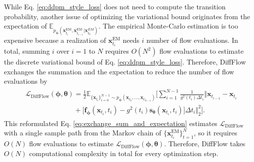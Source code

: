 \documentclass{article}
\theoremstyle{definition}
\theoremstyle{remark}
\begin{document}
	While Eq. \eqref{eq:ddpm_style_loss} does not need to compute the transition probability, another issue of optimizing the variational bound originates from the expectation of $\mathbb{E}_{p_{\bm{\phi}}(\mathbf{x}_{t_{i}}^{\text{EM}},\mathbf{x}_{t_{i-1}}^{\text{EM}}\vert\mathbf{x}_{t_{0}}^{EM})}$. The empirical Monte-Carlo estimation is too expensive because a realization of $\mathbf{x}_{t_{i}}^{\text{EM}}$ needs $i$ number of flow evaluations. In total, summing $i$ over $i=1$ to $N$ requires $O(N^{2})$ flow evaluations to estimate the discrete variational bound of Eq. \eqref{eq:ddpm_style_loss}. Therefore, DiffFlow exchanges the summation and the expectation to reduce the number of flow evaluations by
	\begin{align}
	\begin{split}\label{eq:exchange_sum_and_expectation}
	&\mathcal{L}_{\text{DiffFlow}}(\bm{\phi},\bm{\theta})=\frac{1}{2}\mathbb{E}_{\{\mathbf{x}_{t_{i}}\}_{i=0}^{N-1}\sim p_{\bm{\phi}}(\mathbf{x}_{t_{0}},...,\mathbf{x}_{t_{N-1}})}\bigg[\sum_{i=1}^{N-1}\frac{1}{g^{2}(t_{i})\Delta t_{i}}\Big\Vert\mathbf{x}_{t_{i-1}}-\mathbf{x}_{t_{i}}\\
	&\quad\quad\quad\quad\quad\quad\quad+\big[\mathbf{f}_{\bm{\phi}}(\mathbf{x}_{t_{i}},t_{i})-g^{2}(t_{i})\mathbf{s}_{\bm{\theta}}(\mathbf{x}_{t_{i}},t_{i})\big]\Delta t_{i}\Big\Vert_{2}^{2}\bigg].
	\end{split}
	\end{align}
	This reformulated Eq. \eqref{eq:exchange_sum_and_expectation} estimates $\mathcal{L}_{\text{DiffFlow}}$ with a single sample path from the Markov chain of $\{\mathbf{x}_{t_{i}}^{\text{EM}}\}_{t=1}^{N}$, so it requires $O(N)$ flow evaluations to estimate $\mathcal{L}_{\text{DiffFlow}}(\bm{\phi},\bm{\theta})$. Therefore, DiffFlow takes $O(N)$ computational complexity in total for every optimization step.
	
\end{document}
